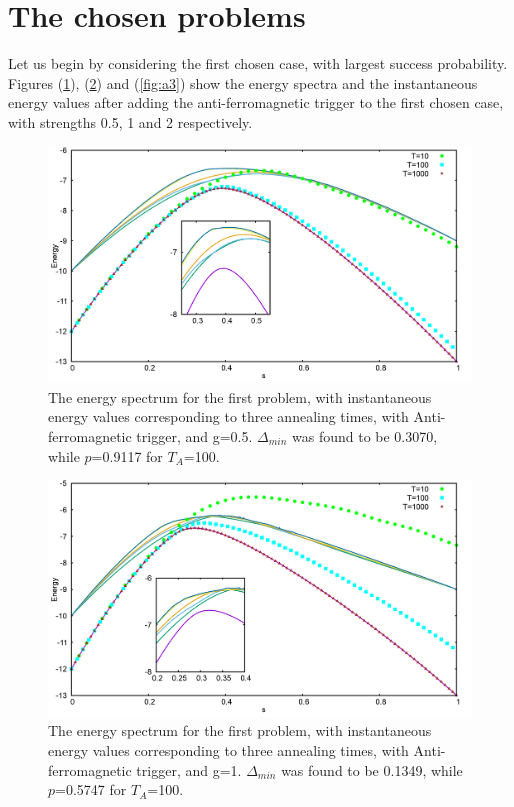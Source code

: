 \documentclass[12]{article}
\begin{document}
\section*{The chosen problems}
Let us begin by considering the first chosen case, with largest success probability. \\
Figures (\ref{fig:a1}), (\ref{fig:a2}) and (\ref{fig:a3}) show the energy spectra and the instantaneous energy values after adding the anti-ferromagnetic trigger to the first chosen case, with strengths 0.5, 1 and 2 respectively.
\begin{figure}[H]
\centering 
\includegraphics[scale=0.3]{733_s12_A_g0.png}
\caption{The energy spectrum for the first problem, with instantaneous energy values corresponding to three annealing times, with Anti-ferromagnetic trigger, and g=0.5. $\Delta_{min}$ was found to be 0.3070, while $p$=0.9117 for $T_A$=100. }
\label{fig:a1}
\end{figure}
\begin{figure}[H]
\centering 
\includegraphics[scale=0.3]{733_s12_A_g1.png}
\caption{The energy spectrum for the first problem, with instantaneous energy values corresponding to three annealing times, with Anti-ferromagnetic trigger, and g=1. $\Delta_{min}$ was found to be 0.1349, while $p$=0.5747 for $T_A$=100. }
\label{fig:a2}
\end{figure}
\end{document}
